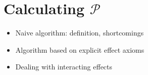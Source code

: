 \section{Calculating $\mathcal{P}$}

\begin{itemize}
\item Naive algorithm: definition, shortcomings
\item Algorithm based on explicit effect axioms
\item Dealing with interacting effects
\end{itemize}


